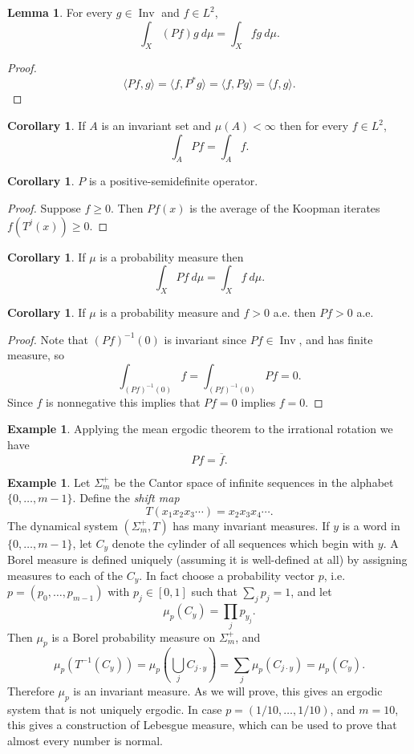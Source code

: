 \documentclass[12pt]{report}
\DeclareMathOperator*{\Inv}{Inv}
\newcommand{\dfn}[1]{\emph{#1}\index{#1}}
\theoremstyle{definition}
\newtheorem{lemma}[theorem]{Lemma}
\newtheorem{corollary}[theorem]{Corollary}
\newtheorem{example}[theorem]{Example}
\begin{document}
\begin{lemma}
For every $g \in \Inv$ and $f \in L^2$,
$$\int_X (Pf)g ~d\mu = \int_X fg ~d\mu.$$
\end{lemma}
\begin{proof}
$$\langle Pf, g\rangle = \langle f, P^*g \rangle = \langle f, Pg \rangle = \langle f, g\rangle.$$
\end{proof}
\begin{corollary}
If $A$ is an invariant set and $\mu(A) < \infty$ then for every $f \in L^2$,
$$\int_A Pf = \int_A f.$$
\end{corollary}
\begin{corollary}
$P$ is a positive-semidefinite operator.
\end{corollary}
\begin{proof}
Suppose $f \geq 0$. Then $Pf(x)$ is the average of the Koopman iterates $f(T^j(x)) \geq 0$.
\end{proof}
\begin{corollary}
If $\mu$ is a probability measure then
$$\int_X Pf~d\mu = \int_X f ~d\mu.$$
\end{corollary}
\begin{corollary}
If $\mu$ is a probability measure and $f > 0$ a.e. then $Pf > 0$ a.e.
\end{corollary}
\begin{proof}
Note that $(Pf)^{-1}(0)$ is invariant since $Pf \in \Inv$, and has finite measure, so
$$\int_{(Pf)^{-1}(0)} f = \int_{(Pf)^{-1}(0)} Pf = 0.$$
Since $f$ is nonnegative this implies that $Pf = 0$ implies $f = 0$.
\end{proof}
\begin{example}
Applying the mean ergodic theorem to the irrational rotation we have
$$Pf = \overline f.$$
\end{example}
\begin{example}
Let $\Sigma_m^+$ be the Cantor space of infinite sequences in the alphabet $\{0, \dots, m-1\}$. Define the \dfn{shift map}
$$T(x_1x_2x_3\cdots) = x_2x_3x_4\cdots.$$
The dynamical system $(\Sigma_m^+, T)$ has many invariant measures. If $y$ is a word in $\{0, \dots, m-1\}$, let $C_y$ denote the cylinder of all sequences which begin with $y$. A Borel measure is defined uniquely (assuming it is well-defined at all) by assigning measures to each of the $C_y$.
In fact choose a probability vector $p$, i.e. $p = (p_0, \dots, p_{m-1})$ with $p_j \in [0, 1]$ such that $\sum_j p_j = 1$, and let
$$\mu_p(C_y) = \prod_j p_{y_j}.$$
Then $\mu_p$ is a Borel probability measure on $\Sigma_m^+$, and
$$\mu_p(T^{-1}(C_y)) = \mu_p\left(\bigcup_j C_{j \cdot y}\right) = \sum_j \mu_p(C_{j \cdot y}) = \mu_p(C_y).$$
Therefore $\mu_p$ is an invariant measure. As we will prove, this gives an ergodic system that is not uniquely ergodic. In case $p = (1/10, \dots, 1/10)$, and $m = 10$, this gives a construction of Lebesgue measure, which can be used to prove that almost every number is normal.
\end{example}
\end{document}
